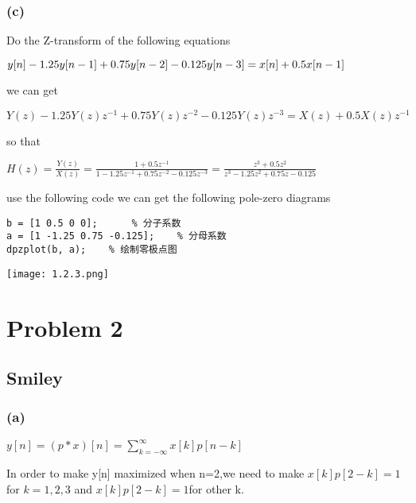 \documentclass{article}
\begin{document}
\subsubsection*{(c)}
Do the Z-transform of the following equations
\begin{center}
    \begin{math}
        \centering
        y[n] - 1.25y[n-1] +0.75y[n-2]-0.125y[n-3] = x[n] +0.5x[n-1]
    \end{math}
\end{center}
we can get
\begin{center}
    \begin{math}
        Y(z) - 1.25Y(z)z^{-1} + 0.75Y(z)z^{-2} - 0.125Y(z)z^{-3} = X(z) + 0.5X(z)z^{-1}
    \end{math}
\end{center}
so that
\begin{center}
    \begin{math}
        H(z) = \frac{Y(z)}{X(z)} = \frac{1+0.5z^{-1}}{1-1.25z^{-1}+0.75z^{-2}-0.125z^{-3}} = \frac{z^3+0.5z^2}{z^3-1.25z^2+0.75z-0.125}
    \end{math}
\end{center}
use the following code we can get the following pole-zero diagrams
\begin{lstlisting}
b = [1 0.5 0 0];      % 分子系数
a = [1 -1.25 0.75 -0.125];    % 分母系数
dpzplot(b, a);    % 绘制零极点图
\end{lstlisting}
\begin{center}
    \texttt{[image: 1.2.3.png]}
\end{center}

\newpage
\section{Problem 2}
\subsection{Smiley}
\subsubsection*{(a)}
\begin{center}
    \begin{math}
        y[n] = (p*x)[n] = \sum_{k=-\infty}^{\infty}x[k]p[n-k]
    \end{math}
\end{center}
In order to make y[n] maximized when n=2,we need to make $x[k]p[2-k] = 1$for $k = 1,2,3$
and $x[k]p[2-k] = 1$for other k.
\end{document}
